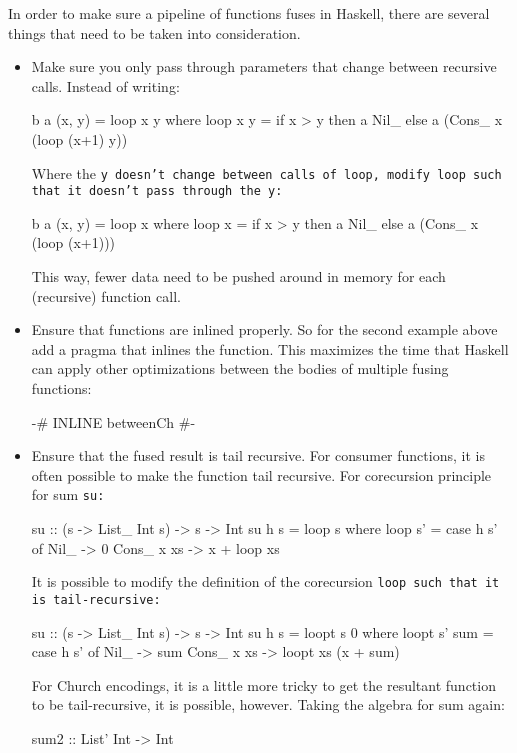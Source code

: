 In order to make sure a pipeline of functions fuses in Haskell, there are several things that need to be taken into consideration.
\begin{itemize}[noitemsep]
    \item Make sure you only pass through parameters that change between recursive calls. Instead of writing:
    \begin{spec}
b a (x, y) = loop x y
  where loop x y = if x > y
                   then a Nil_
                   else a (Cons_ x (loop (x+1) y))
    \end{spec}
    Where the \tt{y} doesn't change between calls of \tt{loop}, modify \tt{loop} such that it doesn't pass through the \tt{y}:
    \begin{spec}
b a (x, y) = loop x
  where loop x = if x > y
                 then a Nil_
                 else a (Cons_ x (loop (x+1)))
    \end{spec}
    This way, fewer data need to be pushed around in memory for each (recursive) function call.
    \item Ensure that functions are inlined properly. So for the second example above add a pragma that inlines the function.
    This maximizes the time that Haskell can apply other optimizations between the bodies of multiple fusing functions:
    \begin{spec}
        {-# INLINE betweenCh #-}
    \end{spec}
    \item Ensure that the fused result is tail recursive.
    For consumer functions, it is often possible to make the function tail recursive.
    For corecursion principle for sum \tt{su}:
    \begin{spec}
su :: (s -> List_ Int s) -> s -> Int
su h s = loop s
  where loop s' = case h s' of
          Nil_ -> 0
                          Cons_ x xs -> x + loop xs
    \end{spec}
    It is possible to modify the definition of the corecursion \tt{loop} such that it is tail-recursive:
    \begin{spec}
su :: (s -> List_ Int s) -> s -> Int
su h s = loopt s 0
  where loopt s' sum = case h s' of
          Nil_ -> sum
                          Cons_ x xs -> loopt xs (x + sum)
    \end{spec}
For Church encodings, it is a little more tricky to get the resultant function to be tail-recursive, it is possible, however.
Taking the algebra for sum again:
    \begin{spec}
sum2 :: List' Int -> Int

\end{spec}
\end{itemize}
